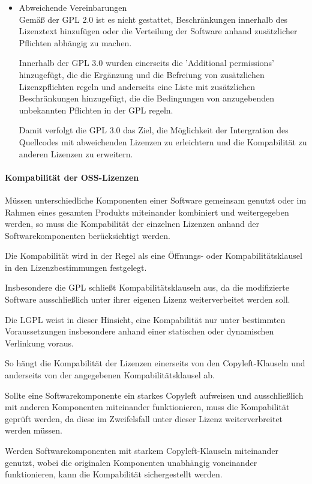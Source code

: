 \begin{itemize}
    \item Abweichende Vereinbarungen\\
    Gemäß der GPL 2.0 ist es nicht gestattet, Beschränkungen innerhalb des Lizenztext hinzufügen oder die Verteilung der Software anhand zusätzlicher Pflichten abhängig zu machen. 

    Innerhalb der GPL 3.0 wurden einerseits die 'Additional permissions' hinzugefügt, die die Ergänzung und die Befreiung von zusätzlichen Lizenzpflichten regeln und anderseits eine Liste mit zusätzlichen Beschränkungen hinzugefügt, die die Bedingungen von anzugebenden unbekannten Pflichten in der GPL regeln.   

    Damit verfolgt die GPL 3.0 das Ziel, die Möglichkeit der Intergration des Quellcodes mit abweichenden Lizenzen zu erleichtern und die Kompabilität zu anderen Lizenzen zu erweitern.     
\end{itemize}

\paragraph{Kompabilität der OSS-Lizenzen}
Müssen unterschiedliche Komponenten einer Software gemeinsam genutzt oder im Rahmen eines gesamten Produkts miteinander kombiniert und weitergegeben werden, so muss die Kompabilität der einzelnen Lizenzen anhand der Softwarekomponenten berücksichtigt werden. 

Die Kompabilität wird in der Regel als eine Öffnungs- oder Kompabilitätsklausel in den Lizenzbestimmungen festgelegt. 

Insbesondere die GPL schließt Kompabilitätsklauseln aus, da die modifizierte Software ausschließlich unter ihrer eigenen Lizenz weiterverbeitet werden soll.

Die LGPL weist in dieser Hinsicht, eine Kompabilität nur unter bestimmten Voraussetzungen insbesondere anhand einer statischen oder dynamischen Verlinkung voraus. 

So hängt die Kompabilität der Lizenzen einerseits von den Copyleft-Klauseln und anderseits von der angegebenen Kompabilitätsklausel ab.

Sollte eine Softwarekomponente ein starkes Copyleft aufweisen und ausschließlich mit anderen Komponenten miteinander funktionieren, muss die Kompabilität geprüft werden, da diese im Zweifelsfall unter dieser Lizenz weiterverbreitet werden müssen. 

Werden Softwarekomponenten mit starkem Copyleft-Klauseln miteinander genutzt, wobei die originalen Komponenten unabhängig voneinander funktionieren, kann die Kompabilität sichergestellt werden. 

